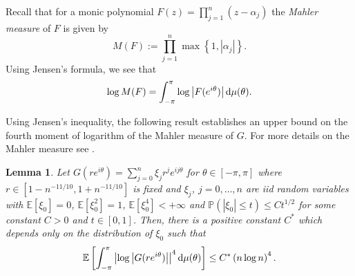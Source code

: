\documentclass[12pt]{amsart}
\theoremstyle{plain}
\numberwithin{equation}{section}
\newtheorem{lemma}[theorem]{Lemma}
\renewcommand{\Pr}{\mathbb{P}}
\newcommand{\<}{\langle}
\renewcommand{\>}{\rangle}
\newcommand{\PP}[1]{\left(#1\right)}
\newcommand{\LL}[1]{\left\{#1\right\}}
\newcommand{\dd}{\textnormal{d}}
\newcommand{\E}[2][ ]{\mathbb{E}{#1}\left[#2\right]}
\newcommand{\abs}[1]{\left|#1\right|}
\renewcommand{\Pr}[1]{\mathds{P}\left(#1\right)}
\begin{document}
Recall that for a monic polynomial $F(z)=\prod_{j=1}^n (z-\alpha_j)$ the {\it Mahler measure} of $F$ is given by
\[
M(F):=\prod_{j=1}^{n} \max\LL{1,\abs{\alpha_j}}.
\]
Using Jensen's formula, we see that
\[
\log M(F) = \int_{-\pi}^{\pi} \log \abs{F(e^{i\theta})} \dd\mu(\theta).
\]


Using Jensen's inequality, the following result establishes an upper bound on the fourth moment of logarithm of the Mahler measure of $G$. For more details on the Mahler measure see \cite{smyth2007mahler}.

\begin{lemma}\label{lem:mahler}
Let $G(re^{i\theta})=\sum_{j=0}^{n} \xi_j r^{j} e^{ij\theta}$ for $\theta\in[-\pi,\pi]$ where $r\in[1-n^{-11/10},1+n^{-11/10}]$ is fixed and $\xi_j$, $j=0,\ldots,n$ are iid random variables with $\E{\xi_0}=0$, $\E{\xi_0^2}=1$, $\E{\xi_0^4}<+\infty$ and $\Pr{\abs{\xi_0}\leq t}\leq C t^{1/2}$ for some constant $C>0$ and $t\in[0,1]$. Then, there is a positive constant $C^{*}$ which depends only on the distribution of $\xi_0$ such that
\[
\E{ \int_{-\pi}^{\pi} \abs{\log\abs{G(re^{i\theta})}}^4 \dd\mu(\theta)} \leq C^{*} \PP{n\log n}^4.
\]
\end{lemma}
\end{document}
